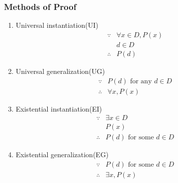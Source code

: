 \subsubsection{Methods of Proof}
\begin{enumerate}
    \item Universal instantiation(UI)
    \begin{align*}
        \because &\forall x \in D , P(x)\\ &d\in D\\
        \therefore &P(d)
    \end{align*}
    \item Universal generalization(UG)
    \begin{align*}
        \because &P(d) \text{ for any } d \in D\\
        \therefore & \forall x, P(x)
    \end{align*}
    \item Existential instantiation(EI)
    \begin{align*}
        \because & \exists x \in D\\ & P(x)\\
        \therefore & P(d) \text{ for some } d \in D 
    \end{align*}
    \item Existential generalization(EG)
    \begin{align*}
        \because & P(d) \text{ for some } d \in D\\
        \therefore & \exists x, P(x)
    \end{align*}
\end{enumerate}